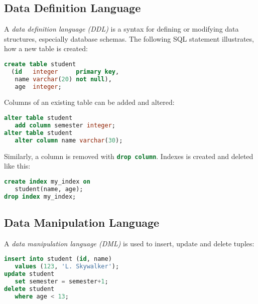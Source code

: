 

\subsection{Data Definition Language}

A \emph{data definition language (DDL)} is a syntax for defining or modifying data structures, especially database schemas. The following SQL statement illustrates, how a new table is created:
\begin{lstlisting}[language=sql]
create table student
  (id   integer     primary key,
   name varchar(20) not null),
   age  integer;
\end{lstlisting}

Columns of an existing table can be added and altered:
\begin{lstlisting}[language=sql]
alter table student
   add column semester integer;
alter table student
   alter column name varchar(30);
\end{lstlisting}

Similarly, a column is removed with \lstinline[language=sql]{drop column}. Indexes is created and deleted like this:

\begin{lstlisting}[language=sql]
create index my_index on
   student(name, age);
drop index my_index;
\end{lstlisting}




\subsection{Data Manipulation Language}

A \emph{data manipulation language (DML)} is used to insert, update and delete tuples:
\begin{lstlisting}[language=sql]
insert into student (id, name)
   values (123, 'L. Skywalker');
update student
   set semester = semester+1;
delete student
   where age < 13;
\end{lstlisting}


